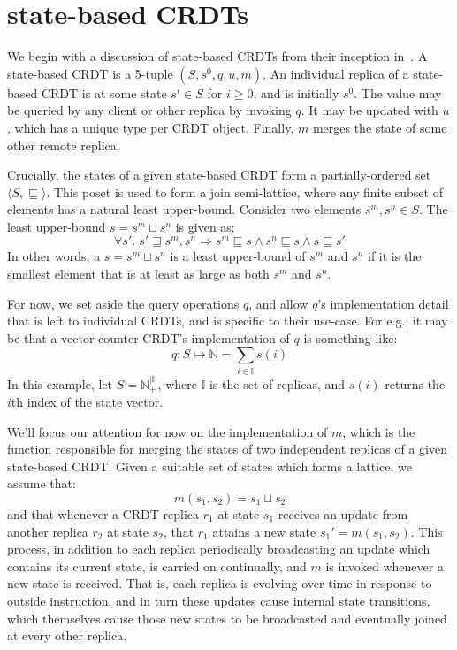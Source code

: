\section{state-based CRDTs}
\label{sec:state-based-crdts}
We begin with a discussion of state-based CRDTs from their inception
in~\citep{shapario11}. A state-based CRDT is a 5-tuple $(S, s^0, q, u, m)$. An
individual replica of a state-based CRDT is at some state $s^i \in S$ for $i \ge
0$, and is initially $s^0$. The value may be queried by any client or other
replica by invoking $q$. It may be updated with $u$, which has a unique type per
CRDT object. Finally, $m$ merges the state of some other remote replica.

Crucially, the states of a given state-based CRDT form a partially-ordered set
$\langle S, \sqsubseteq \rangle$. This poset is used to form a join
semi-lattice, where any finite subset of elements has a natural least
upper-bound. Consider two elements $s^m, s^n \in S$. The least upper-bound
$s = s^m \sqcup s^n$ is given as:
\[
  \forall s'.\; s' \sqsupseteq s^m, s^n \Rightarrow
    s^m \sqsubseteq s \land
    s^n \sqsubseteq s \land
    s \sqsubseteq s'
\]
In other words, a $s = s^m \sqcup s^n$ is a least upper-bound of $s^m$ and $s^n$
if it is the smallest element that is at least as large as both $s^m$ and $s^n$.

For now, we set aside the query operations $q$, and allow $q$'s implementation
detail that is left to individual CRDTs, and is specific to their use-case. For
e.g., it may be that a vector-counter CRDT's implementation of $q$ is
something like:
\[
  q : S \mapsto \mathbb{N} = \sum_{i \in \mathbb{I}} s(i)
\]
In this example, let $S = \mathbb{N}^{|\mathbb{I}|}_+$, where $\mathbb{I}$ is
the set of replicas, and $s(i)$ returns the $i$th index of the state vector.

We'll focus our attention for now on the implementation of $m$, which is the
function responsible for merging the states of two independent replicas of a
given state-based CRDT. Given a suitable set of states which forms a lattice, we
assume that:
\[
  m(s_1, s_2) = s_1 \sqcup s_2
\]
and that whenever a CRDT replica $r_1$ at state $s_1$ receives an update from
another replica $r_2$ at state $s_2$, that $r_1$ attains a new state $s_1' =
m(s_1, s_2)$. This process, in addition to each replica periodically
broadcasting an update which contains its current state, is carried on
continually, and $m$ is invoked whenever a new state is received. That is, each
replica is evolving over time in response to outside instruction, and in turn
these updates cause internal state transitions, which themselves cause those new
states to be broadcasted and eventually joined at every other replica.

